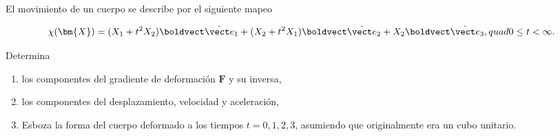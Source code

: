 \documentclass[../main.tex]{subfiles}
\begin{document}
\begin{problema}
	El movimiento de un cuerpo se describe por el siguiente mapeo

	\begin{equation*}
		\chi(\bm{X}) = (X_{1} + t^{2}X_{2})\ev{1} +
		(X_{2} + t^{2}X_{1})\ev{2} +
		X_{2}\ev{3},\\quad
		0 \leq t < \infty.
	\end{equation*}

	Determina

	\begin{enumerate}
		\item los componentes del gradiente de deformación \(\bm{F}\) y su inversa,
		\item los componentes del desplazamiento, velocidad y aceleración,
		\item Esboza la forma del cuerpo deformado a los tiempos
		      \(t = 0,1,2,3\), asumiendo que originalmente era un cubo unitario.
	\end{enumerate}
\end{problema}
\end{document}
